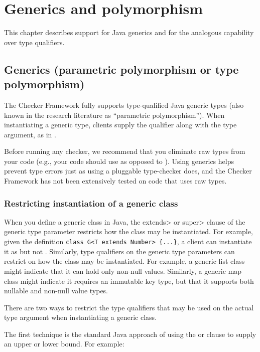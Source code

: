 \htmlhr
\chapter{Generics and polymorphism\label{polymorphism}}

This chapter describes support for Java generics and for the analogous
capability over type qualifiers.


\section{Generics (parametric polymorphism or type polymorphism)\label{generics}}

The Checker Framework fully supports
type-qualified Java generic types (also known in the research literature as ``parametric
polymorphism'').
When instantiating a generic type,
clients supply the qualifier along with the type argument, as in
.

Before running any checker, we recommend that you eliminate
raw types from your code (e.g., your code should use  as
opposed to ).
Using generics helps prevent type errors just as using a pluggable
type-checker does, and the Checker Framework has not been extensively
tested on code that uses raw types.



\subsection{Restricting instantiation of a generic class}

When you define a generic class in Java, the \<extends> or \<super> clause
of the generic type parameter restricts
how the class may be instantiated.  For example, given the definition
\verb|class G<T extends Number> {...}|,
a client can instantiate it as  but not .
Similarly, type qualifiers on the generic type parameters can restrict on
how the class may be instantiated.  For example, a generic list class might
indicate that it can hold only non-null values.  Similarly, a generic map
class might indicate it requires an immutable key type, but that it
supports both nullable and non-null value types.


There are two ways to restrict the type qualifiers that may be used on
the actual type argument when instantiating a generic class.

The first technique is the standard Java approach of using the
 or  clause to supply an upper or lower bound.
For example:

